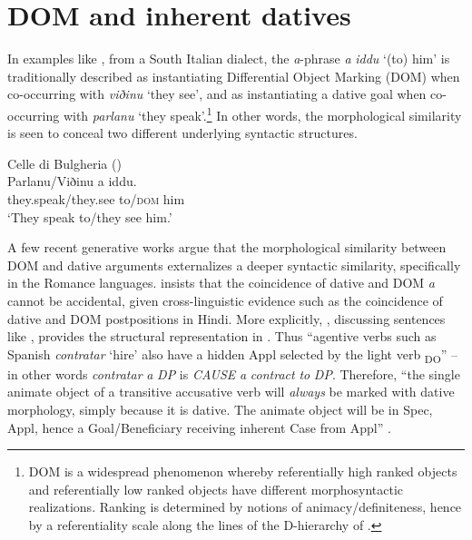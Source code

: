 \documentclass[output=paper,colorlinks,citecolor=brown,modfonts,nonflat]{langsci/langscibook}
\author{M. Rita Manzini\affiliation{Università di Firenze}}
\begin{document}
\maketitle
{}



\section{DOM and inherent datives}\label{sec:manzini:1}

In examples like , from a South Italian dialect, the \textit{a}-phrase \textit{a} \textit{iddu} ‘(to) him’ is traditionally described as instantiating Differential Object Marking (DOM) when co-occurring with \textit{viðinu} ‘they see’, and as instantiating a dative goal when co-occurring with \textit{parlanu} ‘they speak’.\footnote{DOM is a widespread phenomenon \citep{Bossong1985} whereby referentially high ranked objects and referentially low ranked objects have different morphosyntactic realizations. Ranking is determined by notions of animacy/definiteness, hence by a referentiality scale along the lines of the D-hierarchy of \citet{Kiparsky2008}.}  In other words, the morphological similarity is seen to conceal two different underlying syntactic structures.

\ea%
    \label{ex:manzini:1}
    Celle di Bulgheria (\citealt{ManziniSavoia2005})\\
    \gll Parlanu/Viðinu a iddu.\\
        they.speak/they.see to/\textsc{dom} him\\
    \glt ‘They speak to/they see him.’
\z

A few recent generative works argue that the morphological similarity between DOM and dative arguments externalizes a deeper syntactic similarity, specifically in the Romance languages. \citet{Torrego1998} insists that the coincidence of dative and DOM \textit{a} cannot be accidental, given cross-linguistic evidence such as the coincidence of dative and DOM postpositions in Hindi. More explicitly, \citet{Torrego2010}, discussing sentences like , provides the structural representation in . Thus “agentive verbs such as Spanish \textit{contratar} ‘hire’ also have a hidden Appl selected by the light verb {\liv}\textsubscript{DO}” – in other words \textit{contratar} \textit{a} \textit{DP} is \textit{CAUSE} \textit{a} \textit{contract} \textit{to} \textit{DP}. Therefore, “the single animate object of a transitive accusative verb will \textit{always} be marked with dative morphology, simply because it is dative. The animate object will be in Spec, Appl, hence a Goal/Beneficiary receiving inherent Case from Appl” \citep[462]{Torrego2010}.
\end{document}
